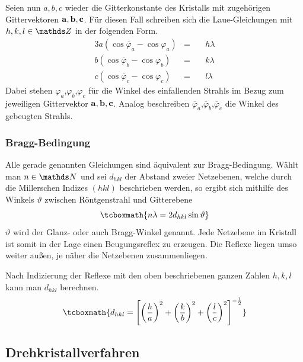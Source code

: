 			Seien nun $a,b,c$ wieder die Gitterkonstante des Kristalls mit zugehörigen Gittervektoren $\bf{a},\bf{b},\bf{c}$.
			Für diesen Fall schreiben sich die Laue-Gleichungen mit $h,k,l\in\SZ$ in der folgenden Form.
			\begin{alignat*}{3}
				a (\cos \overline{\varphi}_a - \cos \varphi_a ) &=&&\ h \lambda \\
				b (\cos \overline{\varphi}_b - \cos \varphi_b ) &=&&\ k \lambda \\
				c (\cos \overline{\varphi}_c - \cos \varphi_c ) &=&&\ l \lambda  
			\end{alignat*}
			Dabei stehen $\varphi_a$,$\varphi_b$,$\varphi_c$ für die Winkel des einfallenden Strahls im Bezug zum jeweiligen Gittervektor $\bf{a},b,c$.
			Analog beschreiben $\overline{\varphi}_a$,$\overline{\varphi}_b$,$\overline{\varphi}_c$ die Winkel des gebeugten Strahls.
		

		\subsubsection{Bragg-Bedingung}
		\label{sssec:bragg}		

			Alle gerade genannten Gleichungen sind äquivalent zur Bragg-Bedingung.
			Wählt man $n\in\SN$ und sei $d_{hkl}$ der Abstand zweier Netzebenen, welche durch die Millerschen Indizes $(hkl)$ beschrieben werden, so ergibt sich mithilfe des Winkels $\vartheta$ zwischen Röntgenstrahl und Gitterebene
			\[
				\tcboxmath{n \lambda = 2 d_{hkl} \sin \vartheta}
			\]
			$\vartheta$ wird der Glanz- oder auch Bragg-Winkel genannt.
			Jede Netzebene im Kristall ist somit in der Lage einen Beugungsreflex zu erzeugen.
			Die Reflexe liegen umso weiter außen, je näher die Netzebenen zusammenliegen.

			Nach Indizierung der Reflexe mit den oben beschriebenen ganzen Zahlen $h,k,l$ kann man $d_{hkl}$ berechnen.
			\[
				\tcboxmath{d_{hkl} = \boxb{ \curvb{\frac{h}{a}}^2 + \curvb{\frac{k}{b}}^2 + \curvb{\frac{l}{c}}^2 }^{-\frac{1}{2}}}
			\]
		


	\subsection{Drehkristallverfahren} %
	\label{sub:drehkristallverfahren}
		
